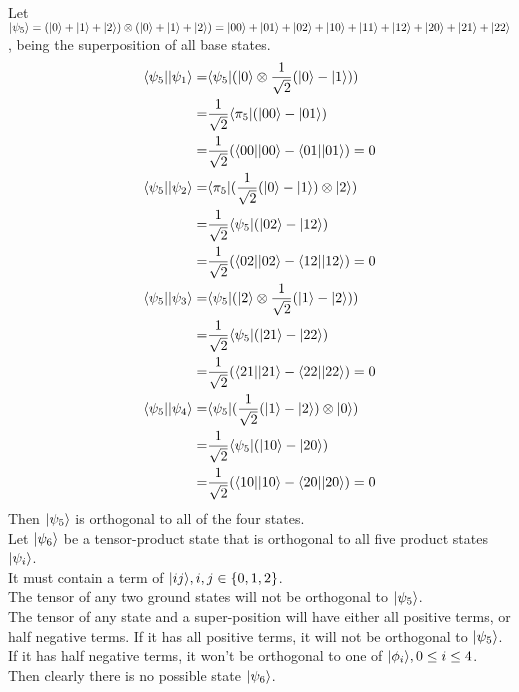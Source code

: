 \documentclass{assignment}
\begin{document}
\begin{problemlist}
  \clearpage
  \pbitem
  \begin{problem}
  \end{problem}
  \begin{answer}
    \\
    Let $\ket{\psi_5} = (\ket{0}+\ket{1}+\ket{2}) \otimes (\ket{0}+\ket{1}+\ket{2}) = \ket{00}+\ket{01}+\ket{02}+\ket{10}+\ket{11}+\ket{12}+\ket{20}+\ket{21}+\ket{22}$, being the superposition of all base states.\\
    \begin{align*}
      \bra{\psi_5}\ket{\psi_1} =& \bra{\psi_5}(\ket{0}\otimes\frac{1}{\sqrt{2}}(\ket{0}-\ket{1}))\\
      =& \frac{1}{\sqrt{2}}\bra{\pi_5}(\ket{00}-\ket{01})\\
      =& \frac{1}{\sqrt{2}}(\bra{00}\ket{00}-\bra{01}\ket{01})= 0\\
      \bra{\psi_5}\ket{\psi_2} =& \bra{\pi_5}(\frac{1}{\sqrt{2}}(\ket{0}-\ket{1})\otimes\ket{2})\\
      =& \frac{1}{\sqrt{2}}\bra{\psi_5}(\ket{02}-\ket{12})\\
      =& \frac{1}{\sqrt{2}}(\bra{02}\ket{02}-\bra{12}\ket{12})= 0\\
      \bra{\psi_5}\ket{\psi_3} =& \bra{\psi_5}(\ket{2}\otimes\frac{1}{\sqrt{2}}(\ket{1}-\ket{2}))\\
      =& \frac{1}{\sqrt{2}}\bra{\psi_5}(\ket{21}-\ket{22})\\
      =& \frac{1}{\sqrt{2}}(\bra{21}\ket{21}-\bra{22}\ket{22})=0\\
      \bra{\psi_5}\ket{\psi_4} =& \bra{\psi_5}(\frac{1}{\sqrt{2}}(\ket{1}-\ket{2})\otimes\ket{0})\\
      =& \frac{1}{\sqrt{2}}\bra{\psi_5}(\ket{10}-\ket{20})\\
      =& \frac{1}{\sqrt{2}}(\bra{10}\ket{10}-\bra{20}\ket{20})= 0\\
    \end{align*}
    Then $\ket{\psi_5}$ is orthogonal to all of the four states.\\
    Let $\ket{\psi_6}$ be a tensor-product state that is orthogonal to all five product states $\ket{\psi_i}$.\\
    It must contain a term of $\ket{ij},i,j\in\{0,1,2\}$.\\
    The tensor of any two ground states will not be orthogonal to $\ket{\psi_5}$.\\
    The tensor of any state and a super-position will have either all positive terms, or half negative terms. If it has all positive terms, it will not be orthogonal to $\ket{\psi_5}$.\\
    If it has half negative terms, it won't be orthogonal to one of $\ket{\phi_i},0\le i\le 4$.\\
    Then clearly there is no possible state $\ket{\psi_6}$.
  \end{answer}
  
\end{problemlist}
\end{document}
